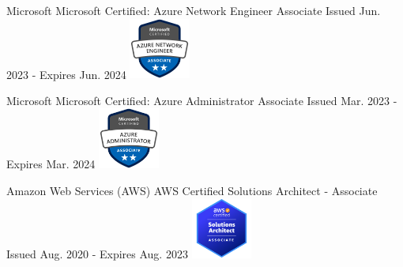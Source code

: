 \graphicspath{ {./images/} }




\begin{cventries}


\cventry
{Microsoft\vspace{2mm}} %
{Microsoft Certified: Azure Network Engineer Associate} %
{} %
{Issued Jun. 2023 - Expires Jun. 2024} %
{ %
\includegraphics[height=2cm]{az-700}
}


\cventry
{Microsoft\vspace{2mm}} %
{Microsoft Certified: Azure Administrator Associate} %
{} %
{Issued Mar. 2023 - Expires Mar. 2024} %
{ %
\includegraphics[height=2cm]{az-104}
}


\cventry
{Amazon Web Services (AWS)\vspace{2mm}} %
{AWS Certified Solutions Architect - Associate} %
{} %
{Issued Aug. 2020 - Expires Aug. 2023} %
{ %
\includegraphics[height=2cm]{aws}
}


\end{cventries}

